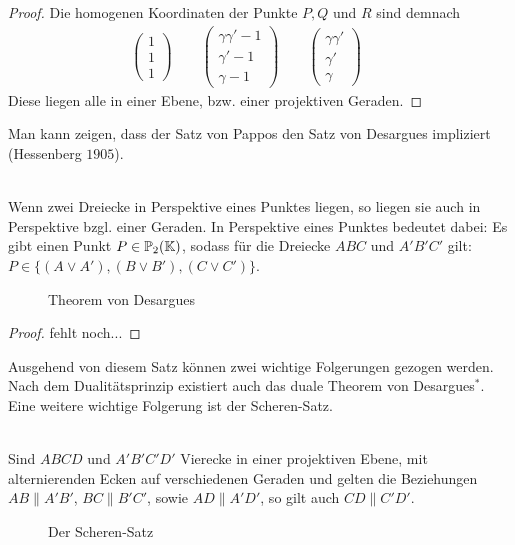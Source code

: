 \begin{proof}
    Die homogenen Koordinaten der Punkte $P,Q$ und $R$ sind demnach
    \begin{align*}
      \begin{pmatrix} 1 \\ 1 \\ 1 \end{pmatrix} \qquad 
      \begin{pmatrix} \gamma\gamma'-1\\ \gamma'-1\\ \gamma-1 \end{pmatrix} \qquad
      \begin{pmatrix} \gamma\gamma'  \\ \gamma'  \\ \gamma   \end{pmatrix} \qquad   
    \end{align*}
    Diese liegen alle in einer Ebene, bzw. einer projektiven Geraden.
  \end{proof}

  Man kann zeigen, dass der Satz von Pappos den Satz von Desargues impliziert (Hessenberg $1905$).

  \begin{thm} \label{Theorem-von-Desargues}\ \\
    Wenn zwei Dreiecke in Perspektive eines Punktes liegen, so liegen sie auch in Perspektive bzgl. einer Geraden. In Perspektive 
    eines Punktes bedeutet dabei: Es gibt einen Punkt $P\in \mathbb{P}_2(\mathbb K)$, sodass für die Dreiecke $ABC$ und $A'B'C'$ gilt: 
    $P\in \big\{ (A\vee A'), (B\vee B'), (C\vee C') \big\}$.
    
    \begin{figure}[h]
      
      \caption{Theorem von Desargues}
    \end{figure}
  \end{thm}

  \begin{proof}
    fehlt noch...
  \end{proof}

  Ausgehend von diesem Satz können zwei wichtige Folgerungen gezogen werden. Nach dem Dualitätsprinzip existiert auch das duale 
  Theorem von Desargues$^*$. Eine weitere wichtige Folgerung ist der Scheren-Satz.

  \begin{thm} \ \\
    Sind $ABCD$ und $A'B'C'D'$ Vierecke in einer projektiven Ebene, mit alternierenden Ecken auf verschiedenen Geraden und gelten 
    die Beziehungen $AB\parallel A'B'$, $BC\parallel B'C'$, sowie $AD\parallel A'D'$, so gilt auch $CD \parallel C'D'$.

    \begin{figure}[h]
      
      \caption{Der Scheren-Satz}
    \end{figure}
  \end{thm}

